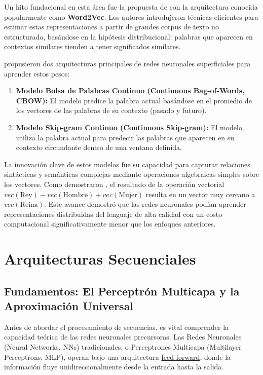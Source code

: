 \documentclass[11pt, a4paper]{article}
\begin{document}
Un hito fundacional en esta área fue la propuesta de \cite{mikolov_efficient_2013} con la arquitectura conocida popularmente como \textbf{Word2Vec}. Los autores introdujeron técnicas
eficientes para estimar estas representaciones a partir de grandes corpus de texto no estructurado, basándose en la hipótesis distribucional: palabras que aparecen en contextos
similares tienden a tener significados similares.

\cite{mikolov_efficient_2013} propusieron dos arquitecturas principales de redes neuronales superficiales para aprender estos pesos:
\begin{enumerate}
    \item \textbf{Modelo Bolsa de Palabras Continuo (Continuous Bag-of-Words, CBOW):} El modelo predice la palabra actual basándose en el promedio de los vectores de las palabras de su 
    contexto (pasado y futuro).
    \item \textbf{Modelo Skip-gram Continuo (Continuous Skip-gram):} El modelo utiliza la palabra actual para predecir las palabras que aparecen en su contexto circundante dentro de una 
    ventana definida.
\end{enumerate}

La innovación clave de estos modelos fue su capacidad para capturar relaciones sintácticas y semánticas complejas mediante operaciones algebraicas simples sobre los vectores. Como demostraron
\cite{mikolov_efficient_2013}, el resultado de la operación vectorial $vec(\text{Rey}) - vec(\text{Hombre}) + vec(\text{Mujer})$ resulta en un vector muy cercano a $vec(\text{Reina})$. 
Este avance demostró que las redes neuronales podían aprender representaciones distribuidas del lenguaje de alta calidad con un costo computacional significativamente menor que los 
enfoques anteriores.

\section{Arquitecturas Secuenciales}

\subsection{Fundamentos: El Perceptrón Multicapa y la Aproximación Universal}

Antes de abordar el procesamiento de secuencias, es vital comprender la capacidad teórica de las redes neuronales precursoras. Las Redes Neuronales (Neural Networks, NNs) tradicionales, o
Perceptrones Multicapa (Multilayer Perceptrons, MLP), operan bajo una arquitectura \hyperlink{feedforward}{feed-forward}, donde la información fluye unidireccionalmente desde la entrada hasta la salida.
\end{document}
